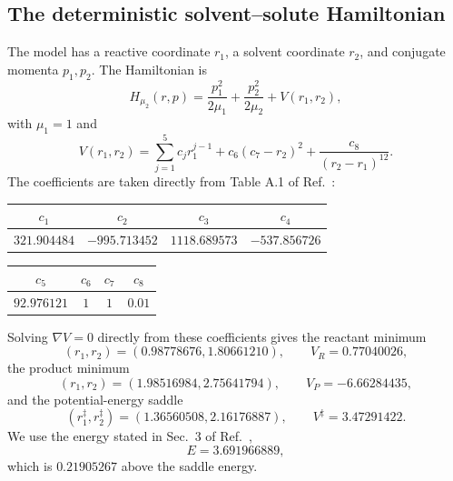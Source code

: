\documentclass[11pt]{article}
\theoremstyle{definition}
\theoremstyle{remark}
\begin{document}
\subsection{The deterministic solvent--solute Hamiltonian}

The model has a reactive coordinate $r_1$, a solvent coordinate $r_2$, and conjugate momenta $p_1,p_2$.  The Hamiltonian is
\begin{equation}
H_{\mu_2}(r,p)
=\frac{p_1^2}{2\mu_1}+\frac{p_2^2}{2\mu_2}+V(r_1,r_2),
\label{eq:solvent-H}
\end{equation}
with $\mu_1=1$ and
\begin{equation}
V(r_1,r_2)
=\sum_{j=1}^{5}c_jr_1^{j-1}
+c_6(c_7-r_2)^2
+\frac{c_8}{(r_2-r_1)^{12}}.
\label{eq:solvent-V}
\end{equation}
The coefficients are taken directly from Table A.1 of Ref.~\cite{GarciaMeseguerCarpenterWiggins2019}:
\begin{center}
\begin{tabular}{c@{\qquad}c@{\qquad}c@{\qquad}c}
\toprule
$c_1$ & $c_2$ & $c_3$ & $c_4$\\
\midrule
$321.904484$ & $-995.713452$ & $1118.689573$ & $-537.856726$\\
\bottomrule
\end{tabular}
\end{center}
\begin{center}
\begin{tabular}{c@{\qquad}c@{\qquad}c@{\qquad}c}
\toprule
$c_5$ & $c_6$ & $c_7$ & $c_8$\\
\midrule
$92.976121$ & $1$ & $1$ & $0.01$\\
\bottomrule
\end{tabular}
\end{center}
Solving $\nabla V=0$ directly from these coefficients gives the reactant minimum
\begin{equation}
(r_1,r_2)=(0.98778676,1.80661210),
\qquad V_R=0.77040026,
\end{equation}
the product minimum
\begin{equation}
(r_1,r_2)=(1.98516984,2.75641794),
\qquad V_P=-6.66284435,
\end{equation}
and the potential-energy saddle
\begin{equation}
(r_1^\ddagger,r_2^\ddagger)=(1.36560508,2.16176887),
\qquad V^\ddagger=3.47291422.
\label{eq:solvent-saddle}
\end{equation}
We use the energy stated in Sec.~3 of Ref.~\cite{GarciaMeseguerCarpenterWiggins2019},
\begin{equation}
E=3.691966889,
\label{eq:solvent-energy}
\end{equation}
which is $0.21905267$ above the saddle energy.
\end{document}
